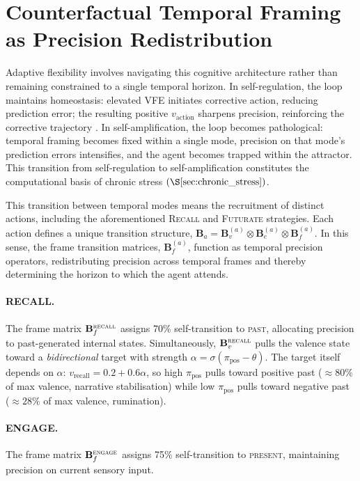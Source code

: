 \documentclass[11pt,a4paper]{article}
\begin{document}
\section{Counterfactual Temporal Framing as Precision Redistribution}\label{sec:counterfactual}

Adaptive flexibility involves navigating this cognitive architecture rather than remaining constrained to a single temporal horizon. In self-regulation, the loop maintains homeostasis: elevated VFE initiates corrective action, reducing prediction error; the resulting positive \(v_{\mathrm{action}}\) sharpens precision, reinforcing the corrective trajectory \citep{joffily2013emotional}. In self-amplification, the loop becomes pathological: temporal framing becomes fixed within a single mode, precision on that mode's prediction errors intensifies, and the agent becomes trapped within the attractor. This transition from self-regulation to self-amplification constitutes the computational basis of chronic stress \(\left(\S\ref{sec:chronic_stress}\right)\).

This transition between temporal modes means the recruitment of distinct actions, including the aforementioned \textsc{Recall} and \textsc{Futurate} strategies. Each action defines a unique transition structure, \(\mathbf{B}_a = \mathbf{B}_v^{(a)} \otimes \mathbf{B}_e^{(a)} \otimes \mathbf{B}_f^{(a)}\). In this sense, the frame transition matrices, \(\mathbf{B}_f^{(a)}\), function as temporal precision operators, redistributing precision across temporal frames and thereby determining the horizon to which the agent attends.

\paragraph{RECALL.} The frame matrix $\mathbf{B}_f^{\textsc{recall}}$ assigns 70\% self-transition to \textsc{past}, allocating precision to past-generated internal states. Simultaneously, $\mathbf{B}_v^{\textsc{recall}}$ pulls the valence state toward a \emph{bidirectional} target with strength $\alpha = \sigma(\pi_{\text{pos}} - \theta)$. The target itself depends on $\alpha$: $v_{\text{recall}} = 0.2 + 0.6\alpha$, so high $\pi_{\text{pos}}$ pulls toward positive past ($\approx 80\%$ of max valence, narrative stabilisation) while low $\pi_{\text{pos}}$ pulls toward negative past ($\approx 28\%$ of max valence, rumination).

\paragraph{ENGAGE.} The frame matrix $\mathbf{B}_f^{\textsc{engage}}$ assigns 75\% self-transition to \textsc{present}, maintaining precision on current sensory input.
\end{document}

